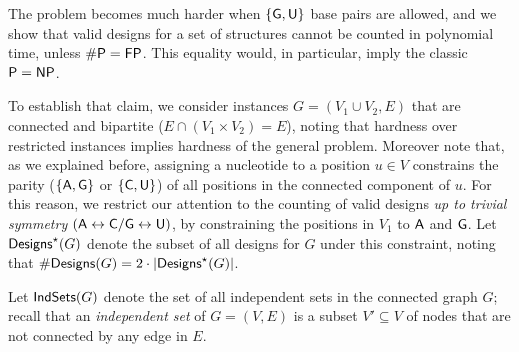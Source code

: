 \documentclass{bmcart}
\newcommand{\Def}[1]{\emph{#1}}
\newcommand{\Design}[1]{{\sf Designs}^{\star}(#1)}
\newcommand{\NumDesign}{\ensuremath{\#}{\sf Designs}\xspace}
\newcommand{\IS}[1]{{\sf IndSets}(#1)}
\newcommand{\Nuc}[1]{{\sf #1}}
\newcommand{\Ab}{\Nuc{A}}
\newcommand{\Cb}{\Nuc{C}}
\newcommand{\Gb}{\Nuc{G}}
\newcommand{\Ub}{\Nuc{U}}
\begin{document}
The problem becomes much harder when $\{\Gb, \Ub\}$ base pairs are allowed, and we show that valid designs for a set of structures cannot be counted in polynomial time, unless ${\sf\# P}={\sf FP}$. This equality would, in particular, imply the classic ${\sf P}={\sf NP}$.

To establish that claim, we consider instances $G=(V_1\cup V_2, E)$ that are connected and bipartite ($E \cap (V_1\times V_2) = E$), noting that hardness over restricted instances implies hardness of the general problem. Moreover note that, as we explained before, assigning a nucleotide to a position $u\in V$ constrains the parity ($\{\Ab,\Gb\}$ or $\{\Cb,\Ub\}$) of all positions in the connected component of $u$. For this reason, we restrict our attention to the counting of valid designs \emph{up to trivial  symmetry} $(\Ab\leftrightarrow \Cb/\Gb\leftrightarrow \Ub)$, by constraining the positions in $V_{1}$ to $\Ab$ and $\Gb$. Let $\Design{G}$ denote the subset of all designs for $G$ under this constraint, noting that $\NumDesign(G) = 2\cdot|\Design{G}|$.

Let $\IS{G}$ denote the set of all independent sets in the connected graph $G$; recall that an \Def{independent set} of $G=(V,E)$ is a subset $V'\subseteq V$ of nodes that are not connected by any edge in $E$. 
\end{document}
